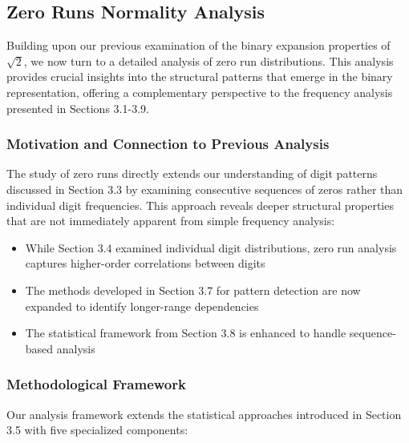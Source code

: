 \subsection{Zero Runs Normality Analysis}

Building upon our previous examination of the binary expansion properties of $\sqrt{2}$, we now turn to a detailed analysis of zero run distributions. This analysis provides crucial insights into the structural patterns that emerge in the binary representation, offering a complementary perspective to the frequency analysis presented in Sections 3.1-3.9.

\subsubsection{Motivation and Connection to Previous Analysis}
The study of zero runs directly extends our understanding of digit patterns discussed in Section 3.3 by examining consecutive sequences of zeros rather than individual digit frequencies. This approach reveals deeper structural properties that are not immediately apparent from simple frequency analysis:

\begin{itemize}
    \item While Section 3.4 examined individual digit distributions, zero run analysis captures higher-order correlations between digits
    \item The methods developed in Section 3.7 for pattern detection are now expanded to identify longer-range dependencies
    \item The statistical framework from Section 3.8 is enhanced to handle sequence-based analysis
\end{itemize}

\subsubsection{Methodological Framework}
Our analysis framework extends the statistical approaches introduced in Section 3.5 with five specialized components:

